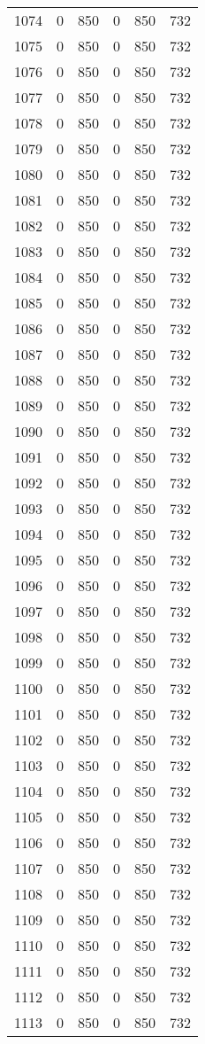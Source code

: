 \documentclass[a4paper]{ctexart}
\begin{document}
\begin{longtable}{p{1cm}|p{2cm}|p{2cm}|p{2cm}|P{2cm}|p{2cm}}
		1074&0&850&0&850&732\\
		1075&0&850&0&850&732\\
		1076&0&850&0&850&732\\
		1077&0&850&0&850&732\\
		1078&0&850&0&850&732\\
		1079&0&850&0&850&732\\
		1080&0&850&0&850&732\\
		1081&0&850&0&850&732\\
		1082&0&850&0&850&732\\
		1083&0&850&0&850&732\\
		1084&0&850&0&850&732\\
		1085&0&850&0&850&732\\
		1086&0&850&0&850&732\\
		1087&0&850&0&850&732\\
		1088&0&850&0&850&732\\
		1089&0&850&0&850&732\\
		1090&0&850&0&850&732\\
		1091&0&850&0&850&732\\
		1092&0&850&0&850&732\\
		1093&0&850&0&850&732\\
		1094&0&850&0&850&732\\
		1095&0&850&0&850&732\\
		1096&0&850&0&850&732\\
		1097&0&850&0&850&732\\
		1098&0&850&0&850&732\\
		1099&0&850&0&850&732\\
		1100&0&850&0&850&732\\
		1101&0&850&0&850&732\\
		1102&0&850&0&850&732\\
		1103&0&850&0&850&732\\
		1104&0&850&0&850&732\\
		1105&0&850&0&850&732\\
		1106&0&850&0&850&732\\
		1107&0&850&0&850&732\\
		1108&0&850&0&850&732\\
		1109&0&850&0&850&732\\
		1110&0&850&0&850&732\\
		1111&0&850&0&850&732\\
		1112&0&850&0&850&732\\
		1113&0&850&0&850&732\\

\end{longtable}
\end{document}
